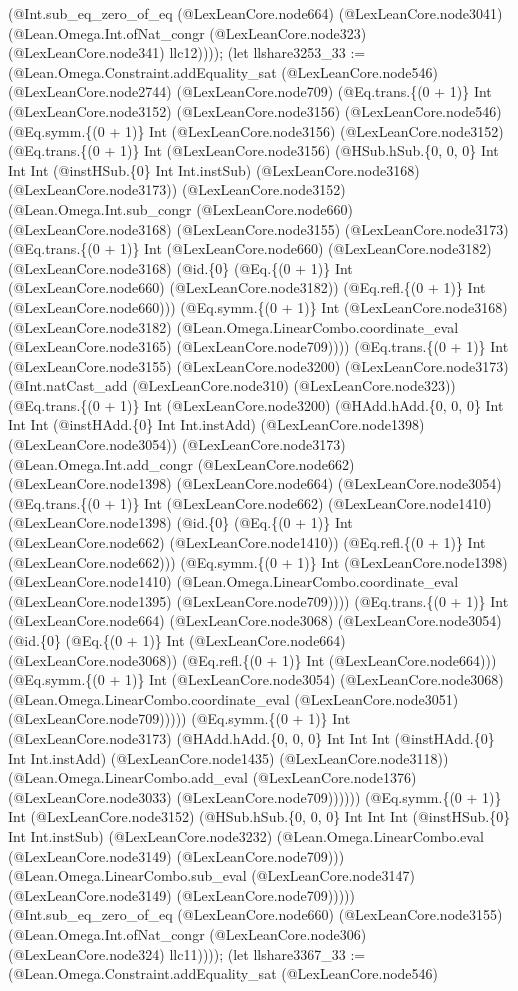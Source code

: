 \documentclass[11pt]{article}
\begin{document}
(@Int.sub\_eq\_zero\_of\_eq (@LexLeanCore.node664) (@LexLeanCore.node3041) (@Lean.Omega.Int.ofNat\_congr (@LexLeanCore.node323) (@LexLeanCore.node341) llc12)))); (let llshare3253\_33 := (@Lean.Omega.Constraint.addEquality\_sat (@LexLeanCore.node546) (@LexLeanCore.node2744) (@LexLeanCore.node709) (@Eq.trans.\{(0 + 1)\} Int (@LexLeanCore.node3152) (@LexLeanCore.node3156) (@LexLeanCore.node546) (@Eq.symm.\{(0 + 1)\} Int (@LexLeanCore.node3156) (@LexLeanCore.node3152) (@Eq.trans.\{(0 + 1)\} Int (@LexLeanCore.node3156) (@HSub.hSub.\{0, 0, 0\} Int Int Int (@instHSub.\{0\} Int Int.instSub) (@LexLeanCore.node3168) (@LexLeanCore.node3173)) (@LexLeanCore.node3152) (@Lean.Omega.Int.sub\_congr (@LexLeanCore.node660) (@LexLeanCore.node3168) (@LexLeanCore.node3155) (@LexLeanCore.node3173) (@Eq.trans.\{(0 + 1)\} Int (@LexLeanCore.node660) (@LexLeanCore.node3182) (@LexLeanCore.node3168) (@id.\{0\} (@Eq.\{(0 + 1)\} Int (@LexLeanCore.node660) (@LexLeanCore.node3182)) (@Eq.refl.\{(0 + 1)\} Int (@LexLeanCore.node660))) (@Eq.symm.\{(0 + 1)\} Int (@LexLeanCore.node3168) (@LexLeanCore.node3182) (@Lean.Omega.LinearCombo.coordinate\_eval (@LexLeanCore.node3165) (@LexLeanCore.node709)))) (@Eq.trans.\{(0 + 1)\} Int (@LexLeanCore.node3155) (@LexLeanCore.node3200) (@LexLeanCore.node3173) (@Int.natCast\_add (@LexLeanCore.node310) (@LexLeanCore.node323)) (@Eq.trans.\{(0 + 1)\} Int (@LexLeanCore.node3200) (@HAdd.hAdd.\{0, 0, 0\} Int Int Int (@instHAdd.\{0\} Int Int.instAdd) (@LexLeanCore.node1398) (@LexLeanCore.node3054)) (@LexLeanCore.node3173) (@Lean.Omega.Int.add\_congr (@LexLeanCore.node662) (@LexLeanCore.node1398) (@LexLeanCore.node664) (@LexLeanCore.node3054) (@Eq.trans.\{(0 + 1)\} Int (@LexLeanCore.node662) (@LexLeanCore.node1410) (@LexLeanCore.node1398) (@id.\{0\} (@Eq.\{(0 + 1)\} Int (@LexLeanCore.node662) (@LexLeanCore.node1410)) (@Eq.refl.\{(0 + 1)\} Int (@LexLeanCore.node662))) (@Eq.symm.\{(0 + 1)\} Int (@LexLeanCore.node1398) (@LexLeanCore.node1410) (@Lean.Omega.LinearCombo.coordinate\_eval (@LexLeanCore.node1395) (@LexLeanCore.node709)))) (@Eq.trans.\{(0 + 1)\} Int (@LexLeanCore.node664) (@LexLeanCore.node3068) (@LexLeanCore.node3054) (@id.\{0\} (@Eq.\{(0 + 1)\} Int (@LexLeanCore.node664) (@LexLeanCore.node3068)) (@Eq.refl.\{(0 + 1)\} Int (@LexLeanCore.node664))) (@Eq.symm.\{(0 + 1)\} Int (@LexLeanCore.node3054) (@LexLeanCore.node3068) (@Lean.Omega.LinearCombo.coordinate\_eval (@LexLeanCore.node3051) (@LexLeanCore.node709))))) (@Eq.symm.\{(0 + 1)\} Int (@LexLeanCore.node3173) (@HAdd.hAdd.\{0, 0, 0\} Int Int Int (@instHAdd.\{0\} Int Int.instAdd) (@LexLeanCore.node1435) (@LexLeanCore.node3118)) (@Lean.Omega.LinearCombo.add\_eval (@LexLeanCore.node1376) (@LexLeanCore.node3033) (@LexLeanCore.node709)))))) (@Eq.symm.\{(0 + 1)\} Int (@LexLeanCore.node3152) (@HSub.hSub.\{0, 0, 0\} Int Int Int (@instHSub.\{0\} Int Int.instSub) (@LexLeanCore.node3232) (@Lean.Omega.LinearCombo.eval (@LexLeanCore.node3149) (@LexLeanCore.node709))) (@Lean.Omega.LinearCombo.sub\_eval (@LexLeanCore.node3147) (@LexLeanCore.node3149) (@LexLeanCore.node709))))) (@Int.sub\_eq\_zero\_of\_eq (@LexLeanCore.node660) (@LexLeanCore.node3155) (@Lean.Omega.Int.ofNat\_congr (@LexLeanCore.node306) (@LexLeanCore.node324) llc11)))); (let llshare3367\_33 := (@Lean.Omega.Constraint.addEquality\_sat (@LexLeanCore.node546) 
\end{document}
